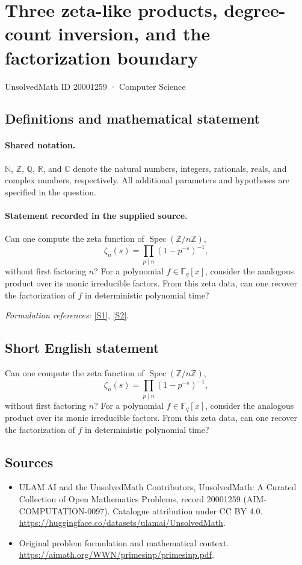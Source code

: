 \documentclass[11pt]{article}
\newcommand{\sref}[2]{\hyperlink{source:#1:#2}{[S#2]}}
\begin{document}
\setcounter{section}{20001258}
\section{Three zeta-like products, degree-count inversion, and the factorization boundary}\label{20001259}
{\small UnsolvedMath ID 20001259 · Computer Science}
\subsection{Definitions and mathematical statement}

\paragraph{Shared notation.}$\mathbb N$, $\mathbb Z$, $\mathbb Q$, $\mathbb R$, and $\mathbb C$ denote the natural numbers, integers, rationals, reals, and complex numbers, respectively. All additional parameters and hypotheses are specified in the question.


\paragraph{Statement recorded in the supplied source.}
Can one compute the zeta function of $\operatorname{Spec}(\mathbb Z/n\mathbb Z)$,
\[\zeta_n(s)=\prod_{p\mid n}(1-p^{-s})^{-1},\]
without first factoring $n$? For a polynomial $f\in\mathbb F_q[x]$, consider the analogous product over its monic irreducible factors. From this zeta data, can one recover the factorization of $f$ in deterministic polynomial time?
\par\smallskip\textit{Formulation references:} \sref{20001259}{1}, \sref{20001259}{2}.
\subsection{Short English statement}
Can one compute the zeta function of $\operatorname{Spec}(\mathbb Z/n\mathbb Z)$,
\[\zeta_n(s)=\prod_{p\mid n}(1-p^{-s})^{-1},\]
without first factoring $n$? For a polynomial $f\in\mathbb F_q[x]$, consider the analogous product over its monic irreducible factors. From this zeta data, can one recover the factorization of $f$ in deterministic polynomial time?
\subsection{Sources}
\begin{itemize}
\item[\hypertarget{source:20001259:1}{S1}] ULAM.AI and the UnsolvedMath Contributors, UnsolvedMath: A Curated Collection of Open Mathematics Problems, record 20001259 (AIM-COMPUTATION-0097). Catalogue attribution under CC BY 4.0.
\url{https://huggingface.co/datasets/ulamai/UnsolvedMath}.
\item[\hypertarget{source:20001259:2}{S2}] Original problem formulation and mathematical context.
\url{https://aimath.org/WWN/primesinp/primesinp.pdf}.
\end{itemize}
\label{end:20001259}
\end{document}
